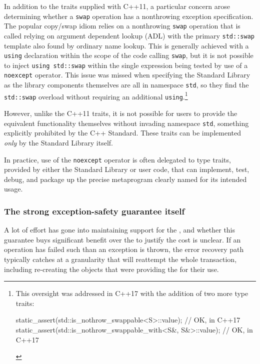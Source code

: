 In addition to the traits supplied with C++11, a particular concern
arose determining whether a \lstinline!swap! operation has a nonthrowing
exception specification. The popular copy/swap idiom relies on a
nonthrowing \lstinline!swap! operation that is called relying on argument
dependent lookup (ADL) with the primary \lstinline!std::swap! template also
found by ordinary name lookup. This is generally achieved with a
\lstinline!using! declaration within the scope of the code calling
\lstinline!swap!, but it is not possible to inject
\lstinline!using!~\lstinline!std::swap! within the single expression being
tested by use of a \lstinline!noexcept! operator. This issue was missed
when specifying the Standard Library as the library components
themselves are all in namespace \lstinline!std!, so they find the
\lstinline!std::swap! overload without requiring an additional
\lstinline!using!.{\cprotect\footnote{This oversight was addressed in C++17
with the addition of two more type traits:

\begin{emcppslisting}[style=footcode]
static_assert(std::is_nothrow_swappable<S>::value);            // OK, in C++17
static_assert(std::is_nothrow_swappable_with<S&, S&>::value);  // OK, in C++17
\end{emcppslisting}
      }}

However, unlike the C++11 traits, it is not possible for users to
provide the equivalent functionality themselves without invading
namespace \lstinline!std!, something explicitly prohibited by the C++
Standard. These traits can be implemented \emph{only} by the Standard
Library itself.

In practice, use of the \lstinline!noexcept! operator is often delegated to
type traits, provided by either the Standard Library or user code, that
can implement, test, debug, and package up the precise metaprogram
clearly named for its intended usage.

\subsubsection[The strong exception-safety guarantee itself]{The strong exception-safety guarantee itself}\label{the-strong-exception-safety-guarantee-itself}

A lot of effort has gone into maintaining support for the , and whether this guarantee buys significant
benefit over the  to justify
the cost is unclear. If an operation has failed such than an exception
is thrown, the error recovery path typically catches at a granularity
that will reattempt the whole transaction, including re-creating the
objects that were providing the  for their use.

